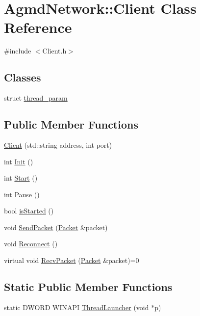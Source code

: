 \hypertarget{class_agmd_network_1_1_client}{\section{Agmd\+Network\+:\+:Client Class Reference}
\label{class_agmd_network_1_1_client}
}


{\ttfamily \#include $<$Client.\+h$>$}

\subsection*{Classes}
\begin{DoxyCompactItemize}
\item 
struct \hyperlink{struct_agmd_network_1_1_client_1_1thread__param}{thread\+\_\+param}
\end{DoxyCompactItemize}
\subsection*{Public Member Functions}
\begin{DoxyCompactItemize}
\item 
\hyperlink{class_agmd_network_1_1_client_a90abcc1c075dca752ed383b1d53c8269}{Client} (std\+::string address, int port)
\item 
int \hyperlink{class_agmd_network_1_1_client_a50a54e0bd136bd9ab05102fbbcc7c7f5}{Init} ()
\item 
int \hyperlink{class_agmd_network_1_1_client_ac53f3137f4fe9e06003dacea520cfb96}{Start} ()
\item 
int \hyperlink{class_agmd_network_1_1_client_a749aae59e2cc935ea190fe8253271523}{Pause} ()
\item 
bool \hyperlink{class_agmd_network_1_1_client_a97401ec9b08423e8a663944e7df1dbaf}{is\+Started} ()
\item 
void \hyperlink{class_agmd_network_1_1_client_aec350453a69e976c506b0728c5a5ff57}{Send\+Packet} (\hyperlink{class_agmd_network_1_1_packet}{Packet} \&packet)
\item 
void \hyperlink{class_agmd_network_1_1_client_a597a290b70c5a3d30876d3bf3a7f0bc0}{Reconnect} ()
\item 
virtual void \hyperlink{class_agmd_network_1_1_client_ae4ccb5b2635151a85c7075f6de619d07}{Recv\+Packet} (\hyperlink{class_agmd_network_1_1_packet}{Packet} \&packet)=0
\end{DoxyCompactItemize}
\subsection*{Static Public Member Functions}
\begin{DoxyCompactItemize}
\item 
static D\+W\+O\+R\+D W\+I\+N\+A\+P\+I \hyperlink{class_agmd_network_1_1_client_ac617a67a113b31d50b2cd323420dd21f}{Thread\+Launcher} (void $\ast$p)
\end{DoxyCompactItemize}
